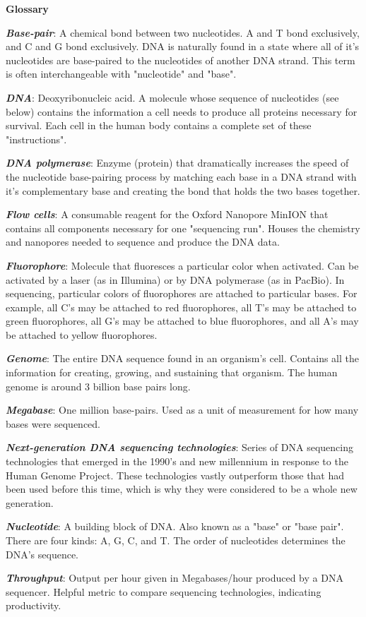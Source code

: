 \documentclass[12pt,letterpaper]{report}
\begin{document}
\setcounter{section}{0}
\begin{center}
\Huge\textbf{Glossary}
\end{center}

\textbf{\textit{Base-pair}}: A chemical bond between two nucleotides. A and T bond exclusively, and C and G bond exclusively. DNA is naturally found in a state where all of it's nucleotides are base-paired to the nucleotides of another DNA strand. This term is often interchangeable with "nucleotide" and "base".

\textbf{\textit{DNA}}: Deoxyribonucleic acid. A molecule whose sequence of nucleotides (see below) contains the information a cell needs to produce all proteins necessary for survival. Each cell in the human body contains a complete set of these "instructions". 

\textbf{\textit{DNA polymerase}}: Enzyme (protein) that dramatically increases the speed of the nucleotide base-pairing process by matching each base in a DNA strand with it's complementary base and creating the bond that holds the two bases together. 

\textbf{\textit{Flow cells}}: A consumable reagent for the Oxford Nanopore MinION that contains all components necessary for one "sequencing run". Houses the chemistry and nanopores needed to sequence and produce the DNA data.

\textbf{\textit{Fluorophore}}: Molecule that fluoresces a particular color when activated. Can be activated by a laser (as in Illumina) or by DNA polymerase (as in PacBio). In sequencing, particular colors of fluorophores are attached to particular bases. For example, all C's may be attached to red fluorophores, all T's may be attached to green fluorophores, all G's may be attached to blue fluorophores, and all A's may be attached to yellow fluorophores. 

\textbf{\textit{Genome}}: The entire DNA sequence found in an organism's cell. Contains all the information for creating, growing, and sustaining that organism. The human genome is around 3 billion base pairs long. 

\textbf{\textit{Megabase}}: One million base-pairs. Used as a unit of measurement for how many bases were sequenced. 

\textbf{\textit{Next-generation DNA sequencing technologies}}: Series of DNA sequencing technologies that emerged in the 1990's and new millennium in response to the Human Genome Project. These technologies vastly outperform those that had been used before this time, which is why they were considered to be a whole new generation. 

\textbf{\textit{Nucleotide}}: A building block of DNA. Also known as a "base" or "base pair". There are four kinds: A, G, C, and T. The order of nucleotides determines the DNA's sequence.

\textbf{\textit{Throughput}}: Output per hour given in Megabases/hour produced by a DNA sequencer. Helpful metric to compare sequencing technologies, indicating productivity.

\clearpage


\end{document}
